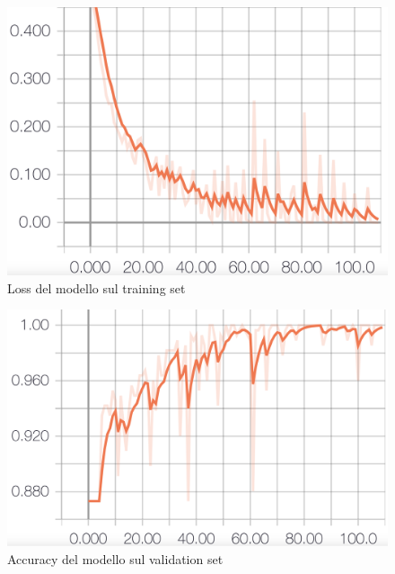 \documentclass[8pt,notitlepage]{report}
\begin{document}
			\begin{figure}[H]
				\begin{center}
					\includegraphics[scale=.1865]{loss_Antonio}
					\caption{Loss del modello sul training set}
				\end{center}
			\end{figure}
			
			\begin{figure}[H]
				\begin{center}
					\includegraphics[scale=.1865]{val_acc_Antonio}
					\caption{Accuracy del modello sul validation set}
					\label{fig:acc_val}
				\end{center}
			\end{figure}
			
\end{document}
